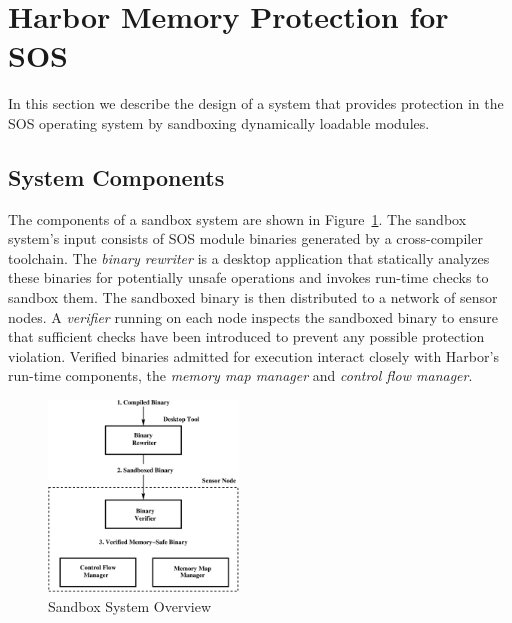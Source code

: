 \section{Harbor Memory Protection for SOS}
\label{sec:writeverify}
In this section we describe the design of a system that provides
protection in the SOS operating system by sandboxing dynamically
loadable modules.
% 
\subsection{System Components}
% 
The components of a sandbox system are shown in Figure~\ref{fig:sys_overview}.
% 
% 
The sandbox system's input consists of SOS module binaries generated by a
cross-compiler toolchain.
% 
The \emph{binary rewriter} is a desktop application that statically
analyzes these binaries for potentially unsafe operations and invokes
run-time checks to sandbox them.
% 
The sandboxed binary is then distributed to a network of sensor nodes.
% 
% 
A \emph{verifier} running on each node inspects the sandboxed binary
to ensure that sufficient checks have been introduced to prevent any
possible protection violation.
%
Verified binaries admitted for execution interact closely with
Harbor's run-time components, the \emph{memory map manager} and
\emph{control flow manager}.
%
\begin{figure}[htbp]
  \centering
  \includegraphics[height = 2.0in, keepaspectratio=true]{figures/sysoverview.eps} 
  \caption{Sandbox System Overview}
  \label{fig:sys_overview}
\end{figure}

